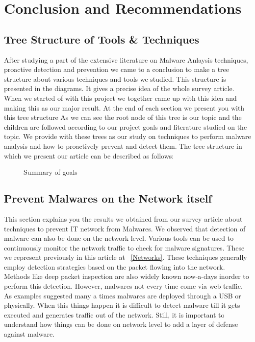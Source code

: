 \documentclass[11pt]{article}
\begin{document}
	

	\section{Conclusion and Recommendations}
	\subsection{Tree Structure of Tools \& Techniques}
	After studying a part of the extensive literature on Malware Anlaysis techniques, proactive detection and prevention we came to a conclusion to make a tree structure about various techniques and tools we studied. This structure is presented in the diagrams. It gives a precise idea of the whole survey article. When we started of with this project we together came up with this idea and making this as our major result. At the end of each section we present you with this tree structure
	As we can see the root node of this tree is our topic and the children are followed according to our project goals and literature studied on the topic. We provide with these trees as our study on techniques to perform malware analysis and how to proactively prevent and detect them.
	The tree structure in which we present our article can be described as follows:\\
	\begin{figure}[h]
		\centering
		\caption{Summary of goals}\label{goals}
	\end{figure}
		
	
	\subsection{Prevent Malwares on the Network itself}
	This section explains you the results we obtained from our survey article about techniques to prevent IT network from Malwares. We observed that detection of malware can also be done on the network level. Various tools can be used to continuously monitor the network traffic to check for malware signatures. These we represent previously in this article at ~\ref{Networks}. 
	These techniques generally employ detection strategies based on the packet flowing into the network. Methods like deep packet inspection are also widely known now-a-days inorder to perform this detection. However, malwares not every time come via web traffic. As examples suggested many a times malwares are deployed through a USB or physically. When this things happen it is difficult to detect malware till it gets executed and generates traffic out of the network. Still, it is important to understand how things can be done on network level to add a layer of  defense against malware.
	
\end{document}
